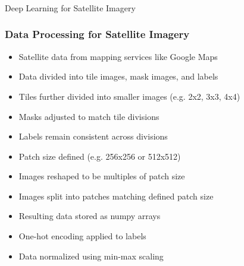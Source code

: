 \begin{frame}[fragile]\frametitle{}
\begin{center}
{\Large Deep Learning for Satellite Imagery}
\end{center}
\end{frame}

\begin{frame}[fragile]\frametitle{Data Processing for Satellite Imagery}
\begin{itemize}
\item Satellite data from mapping services like Google Maps
\item Data divided into tile images, mask images, and labels
\item Tiles further divided into smaller images (e.g. 2x2, 3x3, 4x4)
\item Masks adjusted to match tile divisions
\item Labels remain consistent across divisions
\item Patch size defined (e.g. 256x256 or 512x512)
\item Images reshaped to be multiples of patch size
\item Images split into patches matching defined patch size
\item Resulting data stored as numpy arrays
\item One-hot encoding applied to labels
\item Data normalized using min-max scaling
\end{itemize}
\end{frame}


